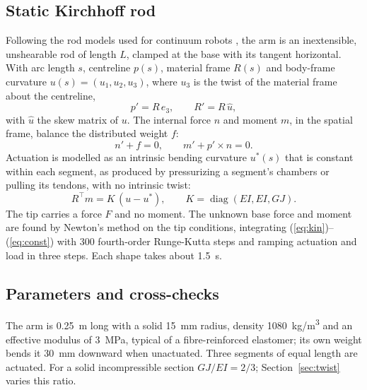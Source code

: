 \documentclass[conference]{IEEEtran}
\begin{document}
\subsection{Static Kirchhoff rod}

Following the rod models used for continuum robots
\cite{rucker2011tendon, till2019realtime}, the arm is an inextensible,
unshearable rod of length $L$, clamped at the base with its tangent
horizontal. With arc length $s$, centreline $p(s)$, material frame $R(s)$
and body-frame curvature $u(s) = (u_1, u_2, u_3)$, where $u_3$ is the twist
of the material frame about the centreline,
\begin{equation}
p' = R\,e_3, \qquad R' = R\,\hat{u},
\label{eq:kin}
\end{equation}
with $\hat{u}$ the skew matrix of $u$. The internal force $n$ and moment
$m$, in the spatial frame, balance the distributed weight $f$:
\begin{equation}
n' + f = 0, \qquad m' + p' \times n = 0 .
\label{eq:eq}
\end{equation}
Actuation is modelled as an intrinsic bending curvature $u^*(s)$ that is
constant within each segment, as produced by pressurizing a segment's
chambers or pulling its tendons, with no intrinsic twist:
\begin{equation}
R^\top m = K\,(u - u^*), \qquad K = \operatorname{diag}(EI, EI, GJ).
\label{eq:const}
\end{equation}
The tip carries a force $F$ and no moment. The unknown base force and moment
are found by Newton's method on the tip conditions, integrating
(\ref{eq:kin})--(\ref{eq:const}) with 300 fourth-order Runge-Kutta steps and
ramping actuation and load in three steps. Each shape takes about
\SI{1.5}{s}.

\subsection{Parameters and cross-checks}

The arm is \SI{0.25}{m} long with a solid \SI{15}{mm} radius, density
\SI{1080}{kg/m^3} and an effective modulus of \SI{3}{MPa}, typical of a
fibre-reinforced elastomer; its own weight bends it \SI{30}{mm} downward
when unactuated. Three segments of equal length are actuated. For a solid
incompressible section $GJ/EI = 2/3$; Section~\ref{sec:twist} varies this
ratio.
\end{document}
